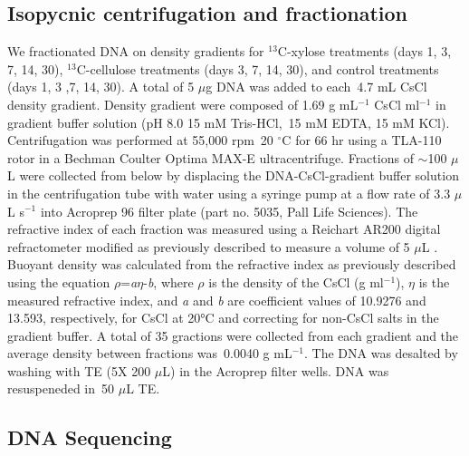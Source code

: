 \documentclass{article}
\begin{document}
\subsection{Isopycnic centrifugation and fractionation} 
We fractionated DNA on density gradients for $^{13}$C-xylose treatments (days
1, 3, 7, 14, 30), $^{13}$C-cellulose treatments (days 3, 7, 14, 30), and
control treatments (days 1, 3 ,7, 14, 30). A total of 5 $\mu$g DNA was added to
each~4.7 mL CsCl density gradient.  Density gradient were composed of 1.69
g mL$^{-1}$ CsCl ml$^{-1}$ in gradient buffer solution (pH 8.0 15 mM
Tris-HCl,~15 mM EDTA, 15 mM KCl). Centrifugation was performed at 55,000 rpm~20
$^{\circ}$C for 66 hr using a TLA-110 rotor in a Bechman Coulter Optima MAX-E
ultracentrifuge. Fractions of $\sim$100 $\mu$L were collected from below by
displacing the DNA-CsCl-gradient buffer solution in the centrifugation tube
with water using a syringe pump at a flow rate of 3.3 $\mu$L s$^{-1}$
\citep{Manefield_2002} into Acroprep 96 filter plate (part no. 5035, Pall Life
Sciences). The refractive index of each fraction was measured using a Reichart
AR200 digital refractometer modified as previously described to measure
a volume of 5 $\mu$L \citep{Buckley_2007}. Buoyant density was calculated from
the refractive index as previously described \citep{Buckley_2007} using the
equation $\rho$=\textit{a}$\eta$-\textit{b}, where $\rho$ is the density of the
CsCl (g ml$^{-1}$), $\eta$ is the measured refractive index, and \textit{a} and
\textit{b} are coefficient values of 10.9276 and 13.593, respectively, for CsCl
at 20°C \citep{9780408708036} and correcting for non-CsCl salts in the gradient
buffer. A total of 35 gractions were collected from each gradient and the
average density between fractions was~0.0040 g mL$^{-1}$. The DNA was desalted
by washing with TE (5X 200 $\mu$L) in the Acroprep filter wells. DNA was
resuspeneded in~50 $\mu$L TE. 

\subsection{DNA Sequencing}
\end{document}

